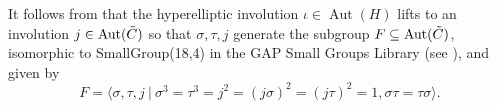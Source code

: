 \documentclass{amsart}
\theoremstyle{remark}
\numberwithin{equation}{section}
\newcommand{\tC}{\Tilde{C}}
\DeclareMathOperator{\Aut}{Aut}
\begin{document}
\begin{figure}[h!]
\caption{}
\end{figure}

It follows from \cite{ries} that the hyperelliptic involution $\iota \in \Aut(H)$ lifts to an involution $j \in \Aut(\Tilde{C})$ so that $\sigma, \tau, j$ generate the subgroup $F \subseteq \Aut(\Tilde{C})$, isomorphic to SmallGroup(18,4) in the GAP Small Groups Library (see \cite{GAP}), and given by $$F = \langle \sigma, \tau, j \: | \: \sigma^3 = \tau^3 = j^2 = (j\sigma)^2 = (j\tau)^2 = 1, \sigma\tau = \tau\sigma \rangle.$$ %
\end{document}
